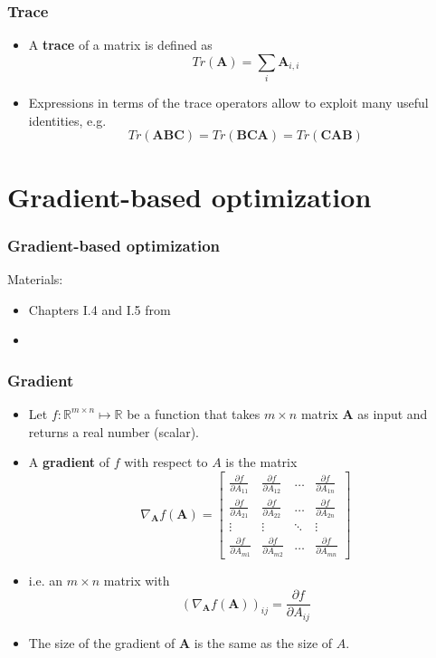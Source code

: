 \documentclass[notes]{beamer}          %
\newcommand{\vect}[1]{\bm{#1}}
\newcommand{\field}[1]{\mathbb{#1}}
\newcommand{\R}{\field{R}}
\begin{document}
\begin{frame}
\frametitle{Trace}
    \begin{itemize}
        \item A {\bf trace} of a matrix is defined as
        $$Tr(\vect{A}) = \sum_{i} \vect{A}_{i,i} $$
        \item Expressions in terms of the trace operators allow to exploit many useful identities, e.g.
        $$Tr(\vect{A}\vect{B}\vect{C}) = Tr(\vect{B}\vect{C}\vect{A}) = Tr(\vect{C}\vect{A}\vect{B})$$
    \end{itemize}

\end{frame}

\section{Gradient-based optimization}


\begin{frame}
\frametitle{Gradient-based optimization}
Materials:
\begin{itemize}
    \item Chapters I.4 and I.5 from \cite{deeplearning}
    \item \cite{linearalgebra}
\end{itemize}
\end{frame}

\begin{frame}
\frametitle{Gradient}
    \begin{itemize}
        \item Let $f: \R^{m \times n} \mapsto \R$ be a function that takes $m \times n$ matrix $\vect{A}$ as input and returns a real number (scalar).
        \item A {\bf gradient} of $f$ with respect to $A$ is the matrix
        $$
        \nabla_{\vect{A}} f(\vect{A}) =
        \begin{bmatrix}
         \frac{\partial f}{\partial A_{11}} & \frac{\partial f}{\partial A_{12}} & \ldots & \frac{\partial f}{\partial A_{1n}} \\
          \frac{\partial f}{\partial A_{21}} & \frac{\partial f}{\partial A_{22}} & \ldots & \frac{\partial f}{\partial A_{2n}} \\
          \vdots & \vdots & \ddots & \vdots \\
           \frac{\partial f}{\partial A_{m1}} & \frac{\partial f}{\partial A_{m2}} & \ldots & \frac{\partial f}{\partial A_{mn}}
        \end{bmatrix}
        $$
        \item i.e. an $m \times n$ matrix with  $$(\nabla_{\vect{A}} f(\vect{A}))_{ij} = \frac{\partial f}{\partial A_{ij}}  $$
        \item The size of the gradient of $\vect{A}$ is the same as the size of $A$.

    \end{itemize}
\end{frame}
\end{document}
